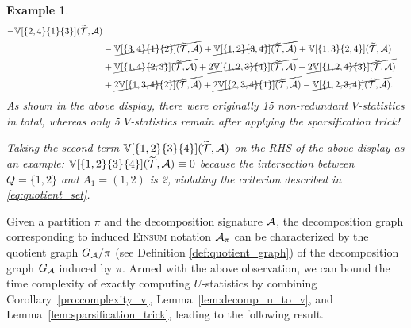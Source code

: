 \documentclass[letterpaper,11pt]{article}
\newtheorem{subexample}{Example}
\def\Einsum{\textsc{Einsum}}
\newcommand{\vstat}{\mathbb{V}}
\begin{document}
\begin{bibunit}[plainnat]
\begin{subexample}
\begin{align*}
- \vstat[\{2,4\}\{1\}\{3\}](\widetilde{ \calT }, \calA)
 \\
& 
- \cancel{\vstat[\{3,4\}\{1\}\{2\}](\widetilde{ \calT }, \calA)}
+ \cancel{\vstat[\{1,2\}\{3,4\}](\widetilde{ \calT }, \calA)}
+ \vstat[\{1,3\}\{2,4\}](\widetilde{ \calT }, \calA)
 \\
& 
+ \cancel{\vstat[\{1,4\}\{2,3\}](\widetilde{ \calT }, \calA)}
+ \cancel{2\vstat[\{1,2,3\}\{4\}](\widetilde{ \calT }, \calA)}
+ \cancel{2\vstat[\{1,2,4\}\{3\}](\widetilde{ \calT }, \calA)} \\
& 
+ \cancel{2\vstat[\{1,3,4\}\{2\}](\widetilde{ \calT }, \calA)}
+ \cancel{2\vstat[\{2,3,4\}\{1\}](\widetilde{ \calT }, \calA)}
- \cancel{\vstat[\{1,2,3,4\}](\widetilde{ \calT }, \calA)}.
\end{align*}
As shown in the above display, there were originally 15 non-redundant $V$-statistics in total, whereas only 5 $V$-statistics remain after applying the sparsification trick! 

Taking the second term $\vstat[\{1,2\}\{3\}\{4\}](\widetilde{ \calT }, \calA)$ on the RHS of the above display as an example: $\vstat[\{1,2\}\{3\}\{4\}](\widetilde{ \calT }, \calA) \equiv 0$ because the intersection between $Q = \{1, 2\}$ and $A_1 = (1, 2)$ is 2, violating the criterion described in \eqref{eq:quotient_set}.
\end{subexample}



Given a partition $\pi$ and the decomposition signature ${\mathcal{A}}$, the decomposition graph corresponding to induced \Einsum{} notation ${\mathcal{A}}_\pi$ can be characterized by the quotient graph $G_{\mathcal{A}} / \pi$ (see Definition \ref{def:quotient_graph}) of the decomposition graph $G_{\mathcal{A}}$ induced by $\pi$. Armed with the above observation, we can bound the time complexity of exactly computing $U$-statistics by combining Corollary~\ref{pro:complexity_v}, Lemma~\ref{lem:decomp_u_to_v}, and Lemma~\ref{lem:sparsification_trick}, leading to the following result.


\end{bibunit}
\end{document}
